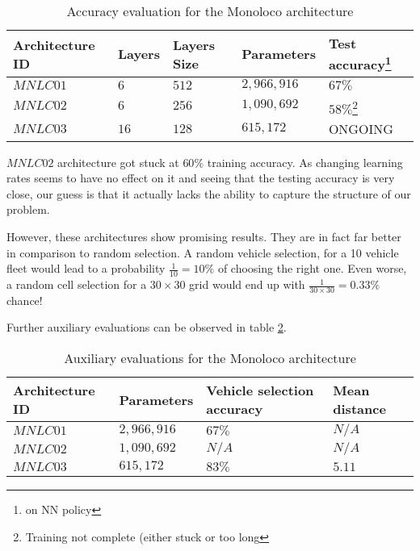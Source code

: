 \documentclass{article}
\begin{document}
\begin{table}[ht]

\caption{Accuracy evaluation for the Monoloco architecture}
	\centering
	\begin{tabular}{|p{2.5cm}||p{1.5cm}|p{2cm}||p{2.5cm}||p{2.5cm}|  }
	
 	\hline
 	Architecture ID & Layers & Layers Size & Parameters & Test accuracy\footnote{on NN policy}\\
 	\hline
 	$MNLC01$ & $6$ & $512$ & $2,966,916$  &   $67\%$\\
 	\hline
 	\hline 
 	$MNLC02$ & $6$	& $256$ & $1,090,692$ & $58\%$\footnote{\label{note1}Training not complete 	(either stuck or too long} \\
 	$MNLC03$ & $16$   & $128$ & $615,172$ & ONGOING \\
 	\hline
 	
	\end{tabular}
	\label{Results:mainEvalTable}
\end{table}

$MNLC02$ architecture got stuck at $60\%$ training accuracy. 
As changing learning rates seems to have no effect on it 
and seeing that the testing accuracy is very close, 
our guess is that it actually lacks the ability to capture the structure of our problem.

However, these architectures show promising results.
They are in fact far better in comparison to random selection.
A random vehicle selection, for a 10 vehicle fleet would lead to a probability $\frac{1}{10} = 10\%$ of choosing the right one.
Even worse, a random cell selection for a $30\times 30$ grid would end up with $\frac{1}{30\times 30} = 0.33\%$ chance!

Further auxiliary evaluations can be observed in table \ref{Results:auxEvalTable}.

\begin{table}[ht]
\caption{Auxiliary evaluations for the Monoloco architecture}
	\centering
	\begin{tabular}{|p{2.5cm}|p{2.5cm}||p{4cm}||p{3cm}|  }
	
 	\hline
 	Architecture ID & Parameters & Vehicle selection accuracy & Mean distance \\
 	\hline
 	$MNLC01$ & $2,966,916$  &   $67\%$ & $N/A$\\
 	\hline
 	\hline 
 	$MNLC02$ & $1,090,692$ & $N/A$ & $N/A$ \\
 	$MNLC03$ & $615,172$ & $83\%$ & $5.11$\\
 	\hline
 	
	\end{tabular}
	\label{Results:auxEvalTable}
\end{table}
\end{document}
